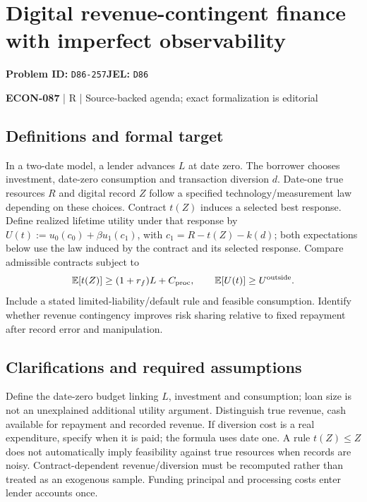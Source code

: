 \documentclass[11pt,a4paper]{article}
\begin{document}
\section*{Digital revenue-contingent finance with imperfect observability}
\textbf{Problem ID:} \texttt{D86-257}\quad \textbf{JEL:} \texttt{D86}\par
\label{problem:OP-0648}


\label{audited:ECON-087}

{\sffamily\small\color{muted}\textbf{ECON-087} | R | Source-backed agenda; exact formalization is editorial\par}

\subsection*{Definitions and formal target}

In a two-date model, a lender advances \(L\) at date zero. The borrower chooses investment, date-zero consumption and transaction diversion \(d\). Date-one true resources \(R\) and digital record \(Z\) follow a specified technology/measurement law depending on these choices. Contract \(t(Z)\) induces a selected best response. Define realized lifetime utility under that response by \(U(t):=u_0(c_0)+\beta u_1(c_1)\), with \(c_1=R-t(Z)-k(d)\); both expectations below use the law induced by the contract and its selected response. Compare admissible contracts subject to
\[
 \mathbb E[t(Z)]\geq(1+r_f)L+C_{\rm proc},\qquad
 \mathbb E[U(t)]\geq U^{\rm outside}.
\]
Include a stated limited-liability/default rule and feasible consumption. Identify whether revenue contingency improves risk sharing relative to fixed repayment after record error and manipulation.

\subsection*{Clarifications and required assumptions}

Define the date-zero budget linking \(L\), investment and consumption; loan size is not an unexplained additional utility argument. Distinguish true revenue, cash available for repayment and recorded revenue. If diversion cost is a real expenditure, specify when it is paid; the formula uses date one. A rule \(t(Z)\leq Z\) does not automatically imply feasibility against true resources when records are noisy. Contract-dependent revenue/diversion must be recomputed rather than treated as an exogenous sample. Funding principal and processing costs enter lender accounts once.
\end{document}
